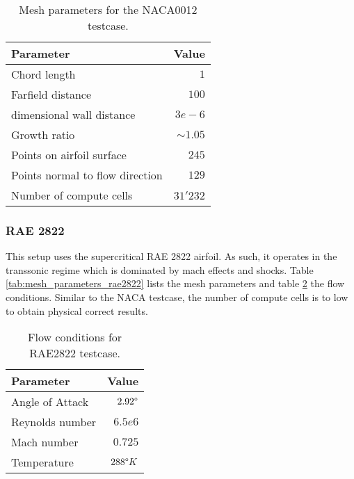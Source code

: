 \begin{table}[H]
    \centering
    \begin{tabular}{l r}
        \toprule
        Parameter                           & Value \\
        \midrule
        Chord length                        & $1$ \\
        Farfield distance                   & $100$ \\
        dimensional wall distance           & $3e-6$ \\
        Growth ratio                        & $\sim 1.05$ \\
        Points on airfoil surface           & $245$\\
        Points normal to flow direction     & $129$ \\
        Number of compute cells             & $31'232$\\
        \bottomrule
    \end{tabular}
    \caption{Mesh parameters for the NACA0012 testcase.}
    \label{tab:mesh_parameters_n0012}
\end{table}


\subsubsection{RAE 2822}
This setup uses the supercritical RAE 2822 airfoil. As such, it operates in the
transsonic regime which is dominated by mach effects and shocks. Table
\ref{tab:mesh_parameters_rae2822} lists the mesh parameters and table
\ref{tab:flow_conditions_rae2822} the flow conditions. Similar to the NACA
testcase, the number of compute cells is to low to obtain physical correct
results. 

\begin{table}[H]
    \centering
    \begin{tabular}{l r}
        \toprule
        Parameter                           & Value \\
        \midrule
        Angle of Attack                     & $2.92 \degree$ \\
        Reynolds number                     & $6.5e6$ \\
        Mach number                         & $0.725$ \\
        Temperature                         & $288 \degree K$\\
        \bottomrule
    \end{tabular}
    \caption{Flow conditions for RAE2822 testcase.}
    \label{tab:flow_conditions_rae2822}
\end{table}

